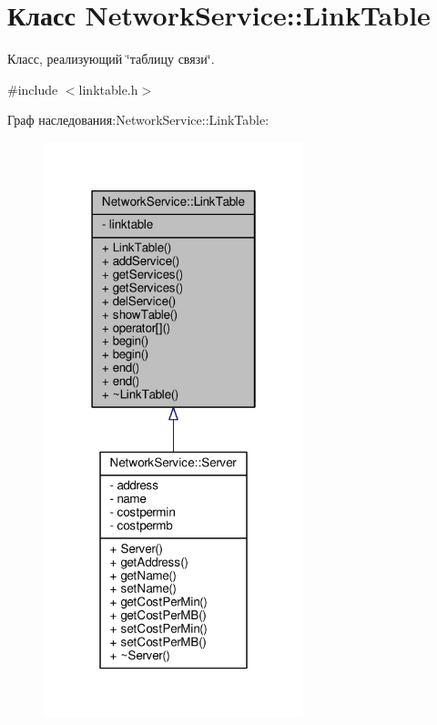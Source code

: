 \hypertarget{class_network_service_1_1_link_table}{}\section{Класс Network\+Service\+:\+:Link\+Table}
\label{class_network_service_1_1_link_table}


Класс, реализующий \char`\"{}таблицу связи\char`\"{}.  




{\ttfamily \#include $<$linktable.\+h$>$}



Граф наследования\+:Network\+Service\+:\+:Link\+Table\+:\nopagebreak
\begin{figure}[H]
\begin{center}
\leavevmode
\includegraphics[width=214pt]{class_network_service_1_1_link_table__inherit__graph}
\end{center}
\end{figure}


